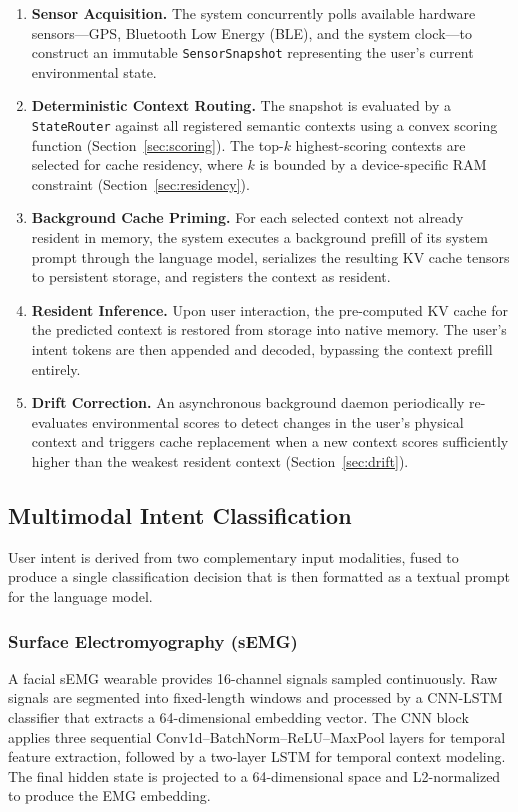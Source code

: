 \documentclass[journal]{IEEEtran}
\begin{document}
\begin{enumerate}
    \item \textbf{Sensor Acquisition.} The system concurrently polls available hardware sensors---GPS, Bluetooth Low Energy (BLE), and the system clock---to construct an immutable \texttt{SensorSnapshot} representing the user's current environmental state.

    \item \textbf{Deterministic Context Routing.} The snapshot is evaluated by a \texttt{StateRouter} against all registered semantic contexts using a convex scoring function (Section~\ref{sec:scoring}). The top-$k$ highest-scoring contexts are selected for cache residency, where $k$ is bounded by a device-specific RAM constraint (Section~\ref{sec:residency}).

    \item \textbf{Background Cache Priming.} For each selected context not already resident in memory, the system executes a background prefill of its system prompt through the language model, serializes the resulting KV cache tensors to persistent storage, and registers the context as resident.

    \item \textbf{Resident Inference.} Upon user interaction, the pre-computed KV cache for the predicted context is restored from storage into native memory. The user's intent tokens are then appended and decoded, bypassing the context prefill entirely.

    \item \textbf{Drift Correction.} An asynchronous background daemon periodically re-evaluates environmental scores to detect changes in the user's physical context and triggers cache replacement when a new context scores sufficiently higher than the weakest resident context (Section~\ref{sec:drift}).
\end{enumerate}

\subsection{Multimodal Intent Classification}
\label{sec:fusion}

User intent is derived from two complementary input modalities, fused to produce a single classification decision that is then formatted as a textual prompt for the language model.

\subsubsection{Surface Electromyography (sEMG)}
A facial sEMG wearable provides 16-channel signals sampled continuously. Raw signals are segmented into fixed-length windows and processed by a CNN-LSTM classifier that extracts a 64-dimensional embedding vector. The CNN block applies three sequential Conv1d--BatchNorm--ReLU--MaxPool layers for temporal feature extraction, followed by a two-layer LSTM for temporal context modeling. The final hidden state is projected to a 64-dimensional space and L2-normalized to produce the EMG embedding.
\end{document}
